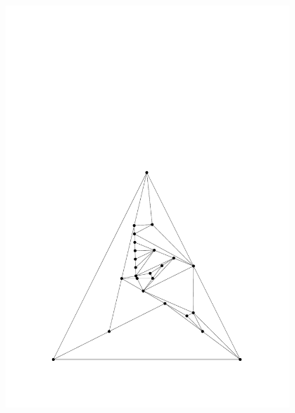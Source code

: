 \begin{figure}
\begin{minipage}{0.48\textwidth}
    \includegraphics[width=0.95\textwidth]{vis_25_2.pdf}
  \end{minipage}

\end{figure}

